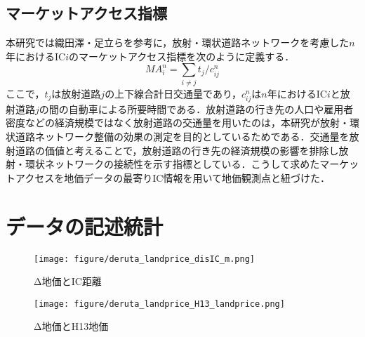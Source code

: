 \subsection{マーケットアクセス指標}
本研究では織田澤・足立らを参考に，放射・環状道路ネットワークを考慮した$n$年におけるIC$i$のマーケットアクセス指標を次のように定義する．
\[{MA}^{n}_{i} = \sum_{i \neq j}{t_{j}/c^{n}_{ij}}\]
ここで，$t_{j}$は放射道路$j$の上下線合計日交通量であり，$c^{n}_{ij}$は$n$年におけるIC$i$と放射道路$j$の間の自動車による所要時間である．放射道路の行き先の人口や雇用者密度などの経済規模ではなく放射道路の交通量を用いたのは，本研究が放射・環状道路ネットワーク整備の効果の測定を目的としているためである．交通量を放射道路の価値と考えることで，放射道路の行き先の経済規模の影響を排除し放射・環状ネットワークの接続性を示す指標としている．こうして求めたマーケットアクセスを地価データの最寄りIC情報を用いて地価観測点と紐づけた．

\section{データの記述統計}
\begin{figure}[H]
  \centering
  \texttt{[image: figure/deruta\_landprice\_disIC\_m.png]}
  \caption{Δ地価とIC距離}
  \label{deruta_landprice disIC_m}
\end{figure}

\begin{figure}[H]
  \centering
  \texttt{[image: figure/deruta\_landprice\_H13\_landprice.png]}
  \caption{Δ地価とH13地価}
  \label{deruta_landprice_H13_landprice}
\end{figure}







